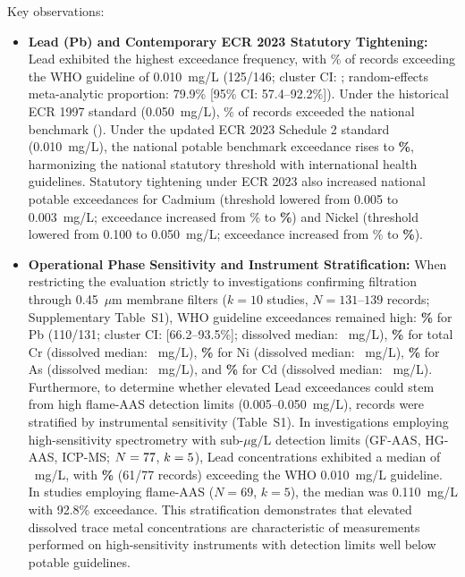 \documentclass[authoryear,preprint,12pt]{elsarticle}
\begin{document}
Key observations:
\begin{itemize}
    \item \textbf{Lead (Pb) and Contemporary ECR 2023 Statutory Tightening:} Lead exhibited the highest exceedance frequency, with \LeadWhoExceedPct\% of records exceeding the WHO guideline of 0.010~mg/L (125/146; cluster CI: \LeadWhoClusterCi; random-effects meta-analytic proportion: 79.9\% [95\% CI: 57.4--92.2\%]). Under the historical ECR 1997 standard (0.050~mg/L), \LeadBdNineteenNinetySevenExceedPct\% of records exceeded the national benchmark (\LeadBdClusterCi). Under the updated ECR 2023 Schedule 2 standard (0.010~mg/L), the national potable benchmark exceedance rises to \textbf{\LeadBdTwentyTwentyThreeExceedPct\%}, harmonizing the national statutory threshold with international health guidelines. Statutory tightening under ECR 2023 also increased national potable exceedances for Cadmium (threshold lowered from 0.005 to 0.003~mg/L; exceedance increased from \CadmiumBdNineteenNinetySevenExceedPct\% to \textbf{\CadmiumBdTwentyTwentyThreeExceedPct\%}) and Nickel (threshold lowered from 0.100 to 0.050~mg/L; exceedance increased from \NickelBdNineteenNinetySevenExceedPct\% to \textbf{\NickelBdTwentyTwentyThreeExceedPct\%}).
    \item \textbf{Operational Phase Sensitivity and Instrument Stratification:} When restricting the evaluation strictly to investigations confirming filtration through 0.45~$\mu\text{m}$ membrane filters ($k=10$ studies, $N=131$--$139$ records; Supplementary Table~S1), WHO guideline exceedances remained high: \textbf{\LeadConfirmedDissolvedWhoPct\%} for Pb (110/131; cluster CI: [66.2--93.5\%]; dissolved median: \LeadConfirmedDissolvedMedian~mg/L), \textbf{\ChromiumConfirmedDissolvedWhoPct\%} for total Cr (dissolved median: \ChromiumConfirmedDissolvedMedian~mg/L), \textbf{\NickelConfirmedDissolvedWhoPct\%} for Ni (dissolved median: \NickelConfirmedDissolvedMedian~mg/L), \textbf{\ArsenicConfirmedDissolvedWhoPct\%} for As (dissolved median: \ArsenicConfirmedDissolvedMedian~mg/L), and \textbf{\CadmiumConfirmedDissolvedWhoPct\%} for Cd (dissolved median: \CadmiumConfirmedDissolvedMedian~mg/L). Furthermore, to determine whether elevated Lead exceedances could stem from high flame-AAS detection limits (0.005--0.050~mg/L), records were stratified by instrumental sensitivity (Table~S1). In investigations employing high-sensitivity spectrometry with sub-$\mu\text{g/L}$ detection limits (GF-AAS, HG-AAS, ICP-MS; $N=77$, $k=5$), Lead concentrations exhibited a median of \LeadHighSensMedian~mg/L, with \textbf{\LeadHighSensExceedPct\%} (61/77 records) exceeding the WHO 0.010~mg/L guideline. In studies employing flame-AAS ($N=69$, $k=5$), the median was 0.110~mg/L with 92.8\% exceedance. This stratification demonstrates that elevated dissolved trace metal concentrations are characteristic of measurements performed on high-sensitivity instruments with detection limits well below potable guidelines.

\end{itemize}
\end{document}
